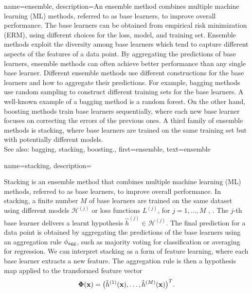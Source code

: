 {
{name={ensemble}, 
	description={An ensemble method combines multiple 
		machine learning (ML) methods, referred to as base learners, to improve overall performance. 
		The base learners can be obtained from empirical risk minimization (ERM), using different choices for 
	 	the loss, model, and training set. Ensemble methods exploit the 
	 	diversity among base learners which tend to capture different aspects of the 
		features of a data point. By aggregating the predictions of 
		base learners, ensemble methods can often achieve better performance than any 
		single base learner. Different ensemble methods use different constructions for 
		the base learners and how to aggregate their predictions. For example, 
		bagging methods use random sampling to construct different training sets 
		for the base learners. A well-known example of a bagging method is a 
		random forest. On the other hand, boosting methods train base learners 
		sequentially, where each new base learner focuses on correcting the errors of the 
		previous ones. A third family of ensemble methods is stacking, where base learners 
		are trained on the same training set but with potentially different models. 
		\\
	 	See also: bagging, stacking, boosting.},
	 first={ensemble},
	 text={ensemble} 
}

{name={stacking}, 
	description={Stacking is an ensemble method that combines multiple 
		machine learning (ML) methods, referred to as base learners, to improve overall performance. 
		In stacking, a finite number $M$ of base learners are trained on the 
		same dataset using different models $\mathcal{H}^{(j)}$ 
		or loss functions $L^{(j)}$, 
        for $j=1,\ldots,M$ \cite[Ch. 8.8]{hastie01statisticallearning},
		\cite{WOLPERT1992241,ZhouEnsemble2012}. 
		The $j$-th base learner delivers a learnt hypothesis 
		$\widehat{h}^{(j)} \in \mathcal{H}^{(j)}$. 
		The final prediction for a data point is obtained by aggregating the 
		predictions of the base learners using an aggregation rule $\phi_{\rm agg}$, 
		such as majority voting for classification or averaging for regression. 
		We can interpret stacking as a form of feature learning, where each base learner 
		extracts a new feature. The aggregation rule is then 
		a hypothesis map applied to the transformed feature vector 
		$${\bf \Phi}({\bf x})= \big( \hat{h}^{(1)}({\bf x}), 
		\ldots, \hat{h}^{(M)}({\bf x}) \big)^{T}.$$
       \begin{figure}[htbp]
		\begin{center}
		\begin{tikzpicture}[
		font=\small,
		scale=1.0, transform shape,
		node distance=7mm and 10mm,
		dataset/.style={draw, rounded corners, inner sep=2pt},
		learner/.style={draw, rounded corners, minimum width=14mm, minimum height=7mm, inner sep=6pt,align=center},
		op/.style={draw, circle, inner sep=1pt},
		>=latex
		]
		

\end{tikzpicture}
\end{center}
\end{figure}}}}
